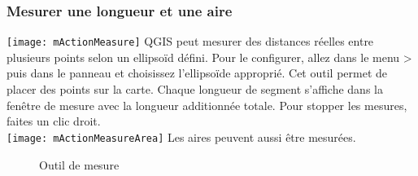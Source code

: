 \subsubsection{Mesurer une longueur et une aire}
\texttt{[image: mActionMeasure]} 
QGIS peut mesurer des distances r\'eelles entre plusieurs points selon un ellipso\"id d\'efini. Pour le configurer, allez dans le menu  > puis dans le panneau  et choisissez l'ellipso\"ide appropri\'e. Cet outil permet de placer des points sur la carte. Chaque longueur de segment s'affiche dans la fen\^etre de mesure avec la longueur additionn\'ee totale. Pour stopper les mesures, faites un clic droit. \\
\texttt{[image: mActionMeasureArea]} Les aires peuvent aussi \^etre mesur\'ees.

\begin{figure}[h]
\caption{Outil de mesure \nixcaption} \label{fig:measure}
\centering
  \goodgap
\end{figure}

%
%
%

